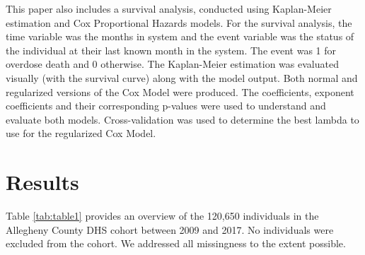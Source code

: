 \documentclass[twoside,10.5pt]{article}
\begin{document}
This paper also includes a survival analysis, conducted using Kaplan-Meier estimation and Cox Proportional Hazards models. For the survival analysis, the time variable was the months in system and the event variable was the status of the individual at their last known month in the system. The event was 1 for overdose death and 0 otherwise. The Kaplan-Meier estimation was evaluated visually (with the survival curve) along with the model output. Both normal and regularized versions of the Cox Model were produced. The coefficients, exponent coefficients and their corresponding p-values were used to understand and evaluate both models. Cross-validation was used to determine the best lambda to use for the regularized Cox Model. 

\section{Results}

Table \ref{tab:table1} provides an overview of the 120,650 individuals in the Allegheny County DHS cohort between 2009 and 2017. No individuals were excluded from the cohort. We addressed all missingness to the extent possible.

\newpage
\end{document}
